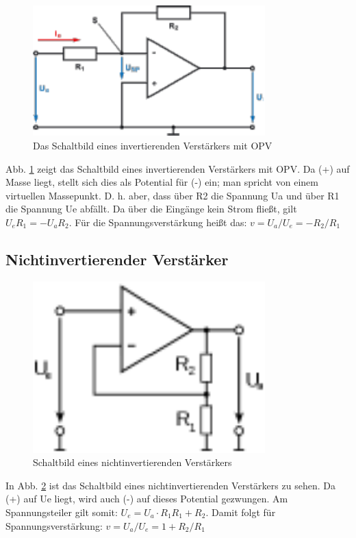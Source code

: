 \begin{figure}[H]
    \centering 
    \includegraphics[width=0.8\textwidth]{Abb/invamp.pdf}
    \caption{Das Schaltbild eines invertierenden Verstärkers mit OPV}
    \label{inv}
\end{figure}
Abb. \ref{inv} zeigt das Schaltbild eines invertierenden Verstärkers mit OPV. Da (+) auf Masse liegt, stellt sich dies als Potential für (-) ein; man spricht von einem virtuellen Massepunkt. D. h. aber, dass über R2 die Spannung Ua und über R1 die Spannung Ue abfällt. Da über die Eingänge kein Strom fließt, gilt $U_eR_1=-U_aR_2$. Für die Spannungsverstärkung heißt das:
$v= U_a/U_e =-R_2/R_1$

\subsection{Nichtinvertierender Verstärker}

\begin{figure}[H]
    \centering
    \includegraphics[width=0.8\textwidth]{Abb/ninv.pdf} 
    \caption{Schaltbild eines nichtinvertierenden Verstärkers}
    \label{ninv}
\end{figure}
In Abb. \ref{ninv} ist das Schaltbild eines nichtinvertierenden Verstärkers zu sehen. Da (+) auf Ue liegt, wird auch (-) auf dieses Potential gezwungen. Am Spannungsteiler gilt somit:
$U_e=U_a·R_1R_1+R_2$. 
Damit folgt für Spannungsverstärkung:
$v=U_a/U_e=1+R_2/R_1$

